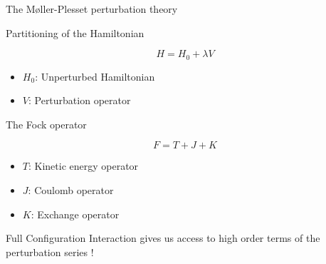 \documentclass[xcolor=x11names,compress]{beamer}
\renewcommand{\(}{\begin{columns}}
\renewcommand{\)}{\end{columns}}
\newcommand{\<}[1]{\begin{column}{#1}}
\renewcommand{\>}{\end{column}}
\begin{document}
\begin{frame}{The Møller-Plesset perturbation theory}

\pause[1]

\begin{beamerboxesrounded}[scheme=foncé]{\centering Partitioning of the Hamiltonian}

\begin{equation}
   H = H_0 + \lambda V
\end{equation}

\end{beamerboxesrounded}

\begin{itemize}
\centering
    \item $H_0$: Unperturbed Hamiltonian
    \item $V$: Perturbation operator
\end{itemize}

\pause[2]

\begin{beamerboxesrounded}[scheme=foncé]{\centering The Fock operator}

\begin{equation}
   F = T + J + K
\end{equation}

\end{beamerboxesrounded}

\begin{itemize}
\centering
    \item $T$: Kinetic energy operator
    \item $J$: Coulomb operator
    \item $K$: Exchange operator
\end{itemize}

\pause[3]

\begin{beamerboxesrounded}[scheme=foncé]{}
\centering
Full Configuration Interaction gives us access to high order terms of the perturbation series !
\end{beamerboxesrounded}
    
\end{frame}
\end{document}
